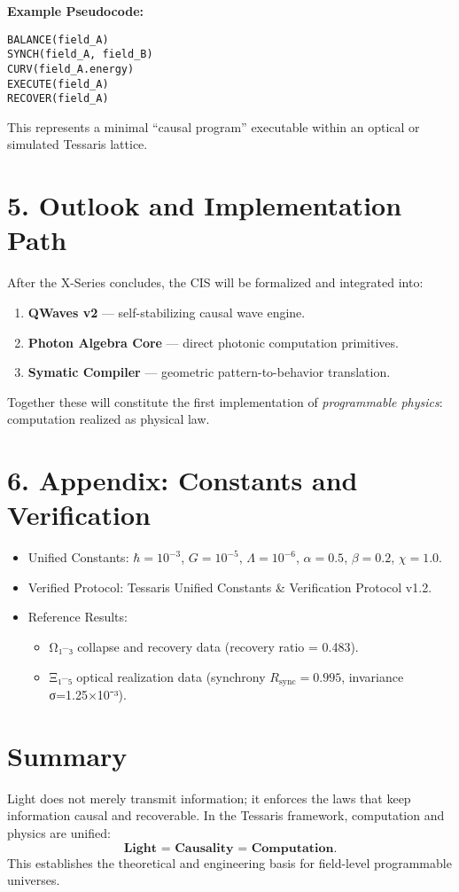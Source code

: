 \documentclass[11pt,a4paper]{article}
\begin{document}
\textbf{Example Pseudocode:}
\begin{verbatim}
BALANCE(field_A)
SYNCH(field_A, field_B)
CURV(field_A.energy)
EXECUTE(field_A)
RECOVER(field_A)
\end{verbatim}
This represents a minimal “causal program” executable within an optical or simulated Tessaris lattice.

\section{5. Outlook and Implementation Path}
After the X-Series concludes, the CIS will be formalized and integrated into:
\begin{enumerate}
  \item \textbf{QWaves v2} --- self-stabilizing causal wave engine.  
  \item \textbf{Photon Algebra Core} --- direct photonic computation primitives.  
  \item \textbf{Symatic Compiler} --- geometric pattern-to-behavior translation.  
\end{enumerate}
Together these will constitute the first implementation of \emph{programmable physics}: computation realized as physical law.

\section{6. Appendix: Constants and Verification}
\begin{itemize}
  \item Unified Constants: $\hbar{=}10^{-3}$, $G{=}10^{-5}$, $\Lambda{=}10^{-6}$, $\alpha{=}0.5$, $\beta{=}0.2$, $\chi{=}1.0$.  
  \item Verified Protocol: Tessaris Unified Constants \& Verification Protocol v1.2.  
  \item Reference Results:  
  \begin{itemize}
    \item Ω₁–₃ collapse and recovery data (recovery ratio = 0.483).  
    \item Ξ₁–₅ optical realization data (synchrony $R_{\mathrm{sync}}=0.995$, invariance σ=1.25×10⁻³).  
  \end{itemize}
\end{itemize}

\section*{Summary}
Light does not merely transmit information; it enforces the laws that keep information causal and recoverable.  
In the Tessaris framework, computation and physics are unified:  
\[
\textbf{Light = Causality = Computation.}
\]
This establishes the theoretical and engineering basis for field-level programmable universes.
\end{document}
